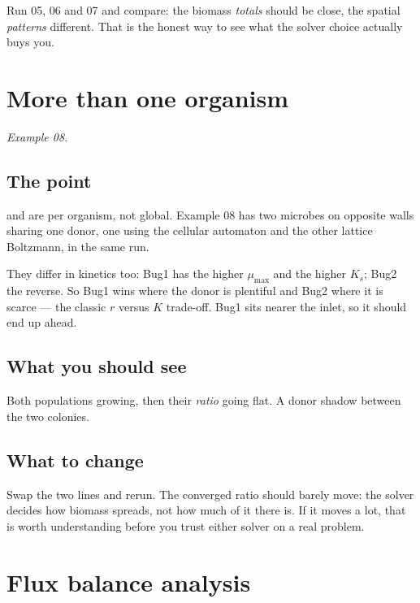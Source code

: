 Run 05, 06 and 07 and compare: the biomass \emph{totals} should be close, the
spatial \emph{patterns} different. That is the honest way to see what the
solver choice actually buys you.

\chapter{More than one organism}
\label{ch:twomicrobes}

\emph{Example 08.}

\section{The point}

 and  are per organism, not global. Example
08 has two microbes on opposite walls sharing one donor, one using the cellular
automaton and the other lattice Boltzmann, in the same run.

They differ in kinetics too: Bug1 has the higher $\mu_{\max}$ and the higher
$K_s$; Bug2 the reverse. So Bug1 wins where the donor is plentiful and Bug2
where it is scarce --- the classic $r$ versus $K$ trade-off. Bug1 sits nearer
the inlet, so it should end up ahead.

\section{What you should see}

Both populations growing, then their \emph{ratio} going flat. A donor shadow
between the two colonies.

\section{What to change}

Swap the two  lines and rerun. The converged ratio should
barely move: the solver decides how biomass spreads, not how much of it there
is. If it moves a lot, that is worth understanding before you trust either
solver on a real problem.

\chapter{Flux balance analysis}
\label{ch:fba}

